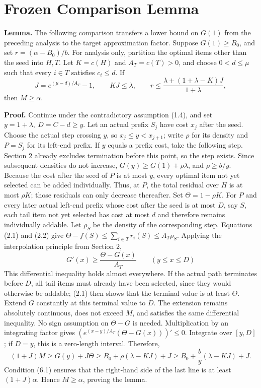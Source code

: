 \documentclass[11pt,a4paper]{article}
\begin{document}
\section{Frozen Comparison Lemma}

\textbf{Lemma.} The following comparison transfers a lower bound on $G(1)$ from the preceding analysis to the target approximation factor. Suppose $G(1)\ge B_0$, and set $r=(\alpha-B_0)/b$. For analysis only, partition the optimal items other than the seed into $H,T$. Let $K=c(H)$ and $A_T=c(T)>0$, and choose $0<d\le\mu$ such that every $i\in T$ satisfies $c_i\le d$. If
\begin{equation}
J=e^{(\mu-d)/A_T}-1,\qquad KJ\le\lambda,\qquad
r\le\frac{\lambda+(1+\lambda-K)J}{1+\lambda},
\tag{6.1}
\end{equation}
then $M\ge\alpha$.

\textbf{Proof.} Continue under the contradictory assumption (1.4), and set $y=1+\lambda,\ D=C-d\ge y$. Let an actual prefix $S_j$ have cost $x_j$ after the seed. Choose the actual step crossing $y$, so $x_j\le y<x_{j+1}$; write $\rho$ for its density and $P=S_j$ for its left-end prefix. If $y$ equals a prefix cost, take the following step.
Section 2 already excludes termination before this point, so the step exists. Since subsequent densities do not increase,
$G(y)\ge G(1)+\rho\lambda$, and $\rho\ge b/y$.
Because the cost after the seed of $P$ is at most $y$, every optimal item not yet selected can be added individually. Thus, at $P$, the total residual over $H$ is at most $\rho K$; those residuals can only decrease thereafter.
Set $\Theta=1-\rho K$. For $P$ and every later actual left-end prefix whose cost after the seed is at most $D$, say $S$, each tail item not yet selected has cost at most $d$ and therefore remains individually addable. Let $\rho_S$ be the density of the corresponding step. Equations (2.1) and (2.2) give
$\Theta-f(S)\le\sum_{i\in T}r_i(S)\le A_T\rho_S$.
Applying the interpolation principle from Section 2,
\[
G'(x)\ge\frac{\Theta-G(x)}{A_T}\qquad(y\le x\le D)
\]
This differential inequality holds almost everywhere. If the actual path terminates before $D$, all tail items must already have been selected, since they would otherwise be addable; (2.1) then shows that the terminal value is at least $\Theta$. Extend $G$ constantly at this terminal value to $D$. The extension remains absolutely continuous, does not exceed $M$, and satisfies the same differential inequality.
No sign assumption on $\Theta-G$ is needed. Multiplication by an integrating factor gives
$(e^{(x-y)/A_T}(\Theta-G(x)))'\le0$. Integrate over $[y,D]$; if $D=y$, this is a zero-length interval. Therefore,
\begin{equation}
(1+J)M\ge G(y)+J\Theta
\ge B_0+\rho(\lambda-KJ)+J
\ge B_0+\frac b y(\lambda-KJ)+J.
\tag{6.2}
\end{equation}
Condition (6.1) ensures that the right-hand side of the last line is at least $(1+J)\alpha$. Hence $M\ge\alpha$, proving the lemma.
\end{document}
